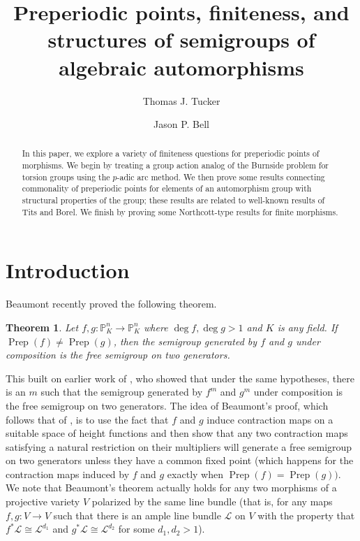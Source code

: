 \documentclass{amsart}
\title[Preperiodic points, finiteness, and structures]{Preperiodic
  points, finiteness, and structures of semigroups of algebraic
  automorphisms}
\author{Thomas J. Tucker}
\author{Jason P. Bell}
\newcommand{\lra}{\longrightarrow}
\newcommand{\bP}{\mathbb{P}}
\newcommand{\CL}{\mathcal{L}}
\DeclareMathOperator{\Prep}{Prep}
\newtheorem{thm}{Theorem}[section]
\theoremstyle{definition}
\begin{document}
\maketitle


\begin{abstract}

  In this paper, we explore a variety of finiteness questions for
  preperiodic points of morphisms.  We begin by treating a group
  action analog of the Burnside problem for torsion groups using the
  $p$-adic arc method.  We then prove some results connecting
  commonality of preperiodic points for elements of an automorphism
  group with structural properties of the group; these results are
  related to well-known results of Tits and Borel.  We finish by
  proving some Northcott-type results for finite morphisms.

\end{abstract}



\section{Introduction}\label{intro}


Beaumont \cite{Beaumont} recently proved the following theorem.

\begin{thm}
Let $f,g: \bP_K^n \lra \bP_K^n$ where $\deg f, \deg g > 1$ and $K$ is
any field.  If $\Prep(f) \not= \Prep(g)$, then the semigroup generated
by $f$ and $g$ under composition is the free semigroup on two generators.
\end{thm}

This built on earlier work of \cite{BHPT}, who showed that under the
same hypotheses, there is an $m$ such that the semigroup generated by
$f^m$ and $g^m$ under composition is the free semigroup on two
generators.  The idea of Beaumont's proof, which follows that of
\cite{BHPT}, is to use the fact that $f$ and $g$ induce contraction
maps on a suitable space of height functions and then show that any two
contraction maps satisfying a natural restriction on their multipliers
will generate a free semigroup on two generators unless they have a
common fixed point (which happens for the contraction maps induced by
$f$ and $g$ exactly when $\Prep(f) = \Prep(g))$.  We note that
Beaumont's theorem actually holds for any two morphisms of a projective
variety $V$ polarized by the same line bundle (that is, for any maps $f,g:
V \lra V$ such that there is an ample line bundle $\CL$ on $V$ with the
property that $f^* \CL \cong \CL^{d_1}$ and $g^*\CL \cong \CL^{d_2}$ for some
$d_1, d_2 > 1$).  
\end{document}
